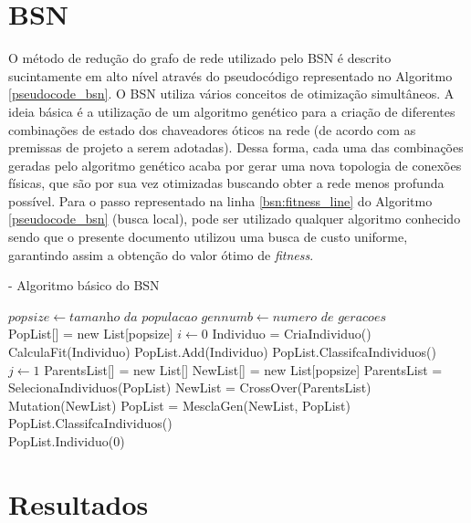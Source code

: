 
\section{BSN}
O método de redução do grafo de rede utilizado pelo BSN é descrito sucintamente em alto nível através do pseudocódigo representado no Algoritmo \ref{pseudocode_bsn}. O BSN utiliza vários conceitos de otimização simultâneos. A ideia básica é a utilização de um algoritmo genético para a criação de diferentes combinações de estado dos chaveadores óticos na rede (de acordo com as premissas de projeto a serem adotadas). Dessa forma, cada uma das combinações geradas pelo algoritmo genético acaba por gerar uma nova topologia de conexões físicas, que são por sua vez otimizadas buscando obter a rede menos profunda possível. Para o passo representado na linha \ref{bsn:fitness_line} do Algoritmo \ref{pseudocode_bsn} (busca local), pode ser utilizado qualquer algoritmo conhecido sendo que o presente documento utilizou uma busca de custo uniforme, garantindo assim a obtenção do valor ótimo de \emph{fitness}.

\begin{algorithm} [h]
\caption{ - Algoritmo básico do BSN}
\begin{algorithmic}[1]
\State $popsize\gets \textit{tamanho da populacao}$
\State $gennumb\gets \textit{numero de geracoes}$\\
\State PopList[] = new List[popsize]
\State $i\gets 0$
\State Individuo = CriaIndividuo()
\State CalculaFit(Individuo)\label{bsn:fitness_line}
\State PopList.Add(Individuo)
\State PopList.ClassifcaIndividuos()
\EndWhile{}\\
\State $j\gets 1$
\State ParentsList[] = new List[]
\State NewList[] = new List[popsize]
\State ParentsList = SelecionaIndividuos(PopList)
\State NewList = CrossOver(ParentsList)
\State Mutation(NewList)
\State PopList = MesclaGen(NewList, PopList)
\State PopList.ClassifcaIndividuos()
\EndWhile\\
\State\Return PopList.Individuo(0)
\end{algorithmic}
\label{pseudocode_bsn}
\end{algorithm}

\section{Resultados}